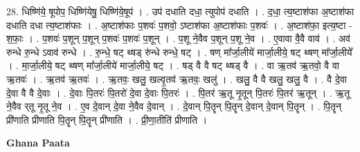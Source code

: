 \documentclass[17pt]{extarticle}
\begin{document}
28. धिष्णि॑ये॒ षूपोप॒ धिष्णि॑येषु॒ धिष्णि॑ये॒षूप॑ । . उप॑ दधाति दधा॒ त्युपोप॑ दधाति । . द॒धा॒ त्य॒ष्टाश॑फा अ॒ष्टाश॑फा दधाति दधा त्य॒ष्टाश॑फाः । . अ॒ष्टाश॑फाः प॒शवः॑ प॒शवो॒ ऽष्टाश॑फा अ॒ष्टाश॑फाः प॒शवः॑ । . अ॒ष्टाश॑फा॒ इत्य॒ष्टा - श॒फाः॒ । . प॒शवः॑ प॒शून् प॒शून् प॒शवः॑ प॒शवः॑ प॒शून् । . प॒शू ने॒वैव प॒शून् प॒शू ने॒व । . ए॒वावा वै॒वै वाव॑ । . अव॑ रुन्धे रु॒न्धे ऽवाव॑ रुन्धे । . रु॒न्धे॒ षट् थ्षड् रु॑न्धे रुन्धे॒ षट् । . षण् मा᳚र्जा॒लीये॑ मार्जा॒लीये॒ षट् थ्षण् मा᳚र्जा॒लीये᳚ । . मा॒र्जा॒लीये॒ षट् थ्षण् मा᳚र्जा॒लीये॑ मार्जा॒लीये॒ षट् । . षड् वै वै षट् थ्षड् वै । . वा ऋ॒तव॑ ऋ॒तवो॒ वै वा ऋ॒तवः॑ । . ऋ॒तव॑ ऋ॒तवः॑ । . ऋ॒तवः॒ खलु॒ खल्वृ॒तव॑ ऋ॒तवः॒ खलु॑ । . खलु॒ वै वै खलु॒ खलु॒ वै । . वै दे॒वा दे॒वा वै वै दे॒वाः । . दे॒वाः पि॒तरः॑ पि॒तरो॑ दे॒वा दे॒वाः पि॒तरः॑ । . पि॒तर॑ ऋ॒तू नृ॒तून् पि॒तरः॑ पि॒तर॑ ऋ॒तून् । . ऋ॒तू ने॒वैव र्‌तू नृ॒तू ने॒व । . ए॒व दे॒वान् दे॒वा ने॒वैव दे॒वान् । . दे॒वान् पि॒तॄन् पि॒तॄन् दे॒वान् दे॒वान् पि॒तॄन् । . पि॒तॄन् प्री॑णाति प्रीणाति पि॒तॄन् पि॒तॄन् प्री॑णाति । . प्री॒णा॒तीति॑ प्रीणाति । \newline

\textbf{Ghana Paata } \newline
\end{document}
